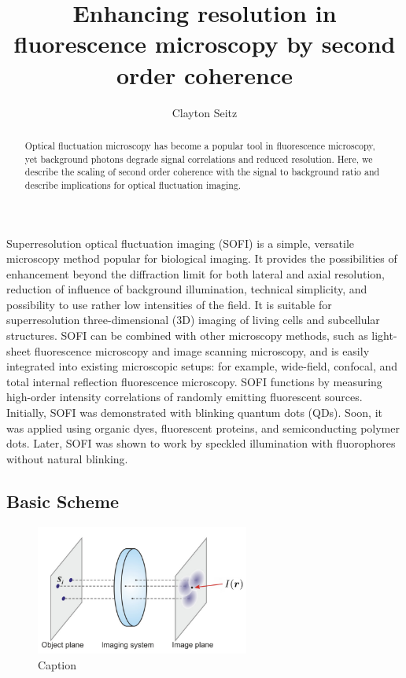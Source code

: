 \documentclass[a4paper, twocolumn, superscriptaddress,prl]{revtex4}  %
\begin{document}
\title{Enhancing resolution in fluorescence microscopy by second order coherence}
\author{Clayton Seitz}

\begin{abstract}
Optical fluctuation microscopy has become a popular tool in fluorescence microscopy, yet background photons degrade signal correlations and reduced resolution. Here, we describe the scaling of second order coherence with the signal to background ratio and describe implications for optical fluctuation imaging. 
\end{abstract}

\maketitle 

Superresolution optical fluctuation imaging (SOFI) is a simple, versatile microscopy method popular for biological imaging. It provides the possibilities of enhancement beyond the diffraction limit for both lateral and axial resolution, reduction of influence of background illumination, technical simplicity, and possibility to use rather low intensities of the field. It is suitable for superresolution three-dimensional (3D) imaging of living cells and subcellular structures. SOFI can be combined with other microscopy methods, such as light-sheet fluorescence microscopy and image scanning microscopy, and is easily integrated into existing microscopic setups: for example, wide-field, confocal, and total internal reflection fluorescence microscopy. SOFI functions by measuring high-order intensity correlations of randomly emitting fluorescent sources. Initially, SOFI was demonstrated with blinking quantum dots (QDs). Soon, it was applied using organic dyes, fluorescent proteins, and semiconducting polymer dots. Later, SOFI was shown to work by speckled illumination with fluorophores without natural blinking.


\subsection{Basic Scheme}

\begin{figure}
\includegraphics[width=7cm]{Scheme.png}
\caption{Caption}
\end{figure}    
\end{document}
